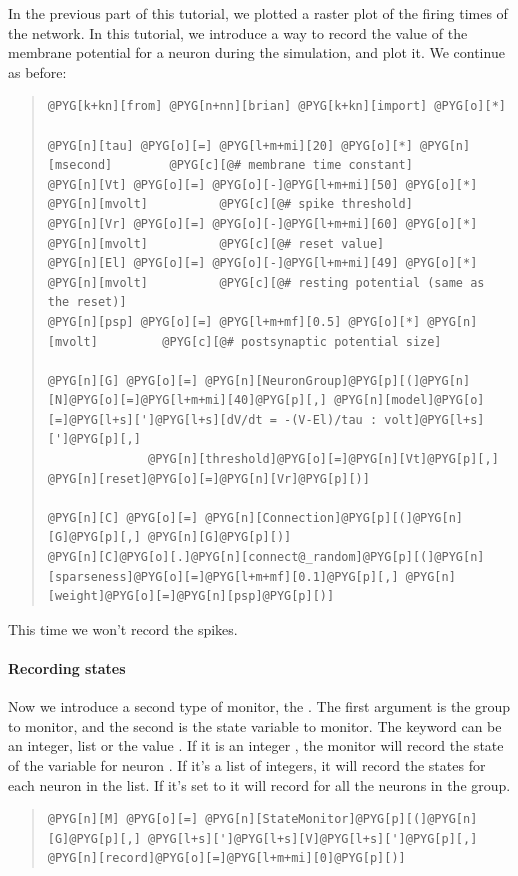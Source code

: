 \documentclass[letterpaper,10pt,english]{manual}
\begin{document}
In the previous part of this tutorial, we plotted a raster plot of
the firing times of the network. In this tutorial, we introduce
a way to record the value of the membrane potential for a neuron
during the simulation, and plot it. We continue as before:
\begin{quote}

\begin{Verbatim}[commandchars=@\[\]]
@PYG[k+kn][from] @PYG[n+nn][brian] @PYG[k+kn][import] @PYG[o][*]

@PYG[n][tau] @PYG[o][=] @PYG[l+m+mi][20] @PYG[o][*] @PYG[n][msecond]        @PYG[c][@# membrane time constant]
@PYG[n][Vt] @PYG[o][=] @PYG[o][-]@PYG[l+m+mi][50] @PYG[o][*] @PYG[n][mvolt]          @PYG[c][@# spike threshold]
@PYG[n][Vr] @PYG[o][=] @PYG[o][-]@PYG[l+m+mi][60] @PYG[o][*] @PYG[n][mvolt]          @PYG[c][@# reset value]
@PYG[n][El] @PYG[o][=] @PYG[o][-]@PYG[l+m+mi][49] @PYG[o][*] @PYG[n][mvolt]          @PYG[c][@# resting potential (same as the reset)]
@PYG[n][psp] @PYG[o][=] @PYG[l+m+mf][0.5] @PYG[o][*] @PYG[n][mvolt]         @PYG[c][@# postsynaptic potential size]

@PYG[n][G] @PYG[o][=] @PYG[n][NeuronGroup]@PYG[p][(]@PYG[n][N]@PYG[o][=]@PYG[l+m+mi][40]@PYG[p][,] @PYG[n][model]@PYG[o][=]@PYG[l+s][']@PYG[l+s][dV/dt = -(V-El)/tau : volt]@PYG[l+s][']@PYG[p][,]
              @PYG[n][threshold]@PYG[o][=]@PYG[n][Vt]@PYG[p][,] @PYG[n][reset]@PYG[o][=]@PYG[n][Vr]@PYG[p][)]

@PYG[n][C] @PYG[o][=] @PYG[n][Connection]@PYG[p][(]@PYG[n][G]@PYG[p][,] @PYG[n][G]@PYG[p][)]
@PYG[n][C]@PYG[o][.]@PYG[n][connect@_random]@PYG[p][(]@PYG[n][sparseness]@PYG[o][=]@PYG[l+m+mf][0.1]@PYG[p][,] @PYG[n][weight]@PYG[o][=]@PYG[n][psp]@PYG[p][)]
\end{Verbatim}
\end{quote}

This time we won't record the spikes.


\paragraph{Recording states}

Now we introduce a second type of monitor, the \hyperlink{brian.StateMonitor}{}.
The first argument is the group to monitor, and the second is
the state variable to monitor. The keyword  can be
an integer, list or the value . If it is an integer ,
the monitor will record the state of the variable for neuron .
If it's a list of integers, it will record the states for
each neuron in the list. If it's set to  it will record
for all the neurons in the group.
\begin{quote}

\begin{Verbatim}[commandchars=@\[\]]
@PYG[n][M] @PYG[o][=] @PYG[n][StateMonitor]@PYG[p][(]@PYG[n][G]@PYG[p][,] @PYG[l+s][']@PYG[l+s][V]@PYG[l+s][']@PYG[p][,] @PYG[n][record]@PYG[o][=]@PYG[l+m+mi][0]@PYG[p][)]
\end{Verbatim}
\end{quote}
\end{document}
